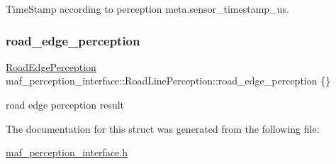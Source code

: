 Time\+Stamp according to perception meta.\+sensor\+\_\+timestamp\+\_\+us. 

\mbox{\label{structmaf__perception__interface_1_1RoadLinePerception_a06514760cd4894868db2f3cf552ec7ac}} 
\subsubsection{\texorpdfstring{road\+\_\+edge\+\_\+perception}{road\_edge\_perception}}
{\footnotesize\ttfamily \hyperlink{structmaf__perception__interface_1_1RoadEdgePerception}{Road\+Edge\+Perception} maf\+\_\+perception\+\_\+interface\+::\+Road\+Line\+Perception\+::road\+\_\+edge\+\_\+perception \{\}}



road edge perception result 



The documentation for this struct was generated from the following file\+:\begin{DoxyCompactItemize}
\item 
\hyperlink{maf__perception__interface_8h}{maf\+\_\+perception\+\_\+interface.\+h}\end{DoxyCompactItemize}
